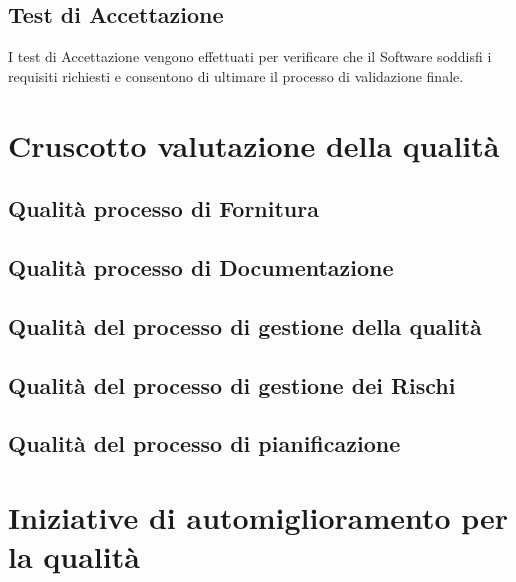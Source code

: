 \documentclass{article}
\begin{document}
\newpage
\subsection{Test di Accettazione} %
I test di Accettazione vengono effettuati per verificare che il Software soddisfi i requisiti richiesti e consentono di ultimare il processo di validazione finale.

\section{Cruscotto valutazione della qualità}


\subsection{Qualità processo di Fornitura}


\subsection{Qualità processo di Documentazione}


\subsection{Qualità del processo di gestione della qualità}


\subsection{Qualità del processo di gestione dei Rischi}


\subsection{Qualità del processo di pianificazione}

\newpage
\section{Iniziative di automiglioramento per la qualità}
\end{document}
